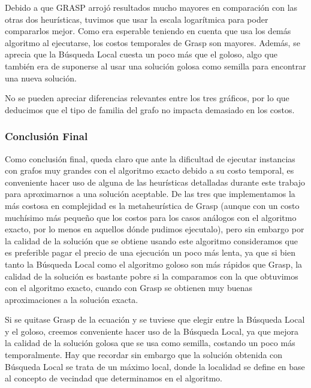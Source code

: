 \quad Debido a que GRASP arrojó resultados mucho mayores en comparación con las otras dos heurísticas, tuvimos que usar la escala logarítmica para poder compararlos mejor. Como era esperable teniendo en cuenta que usa los demás algoritmo al ejecutarse, los costos temporales de Grasp son mayores. Además, se aprecia que la Búsqueda Local cuesta un poco más que el goloso, algo que también era de suponerse al usar una solución golosa como semilla para encontrar una nueva solución.

\quad No se pueden apreciar diferencias relevantes entre los tres gráficos, por lo que deducimos que el tipo de familia del grafo no impacta demasiado en los costos.

\subsubsection{Conclusión Final}

\quad Como conclusión final, queda claro que ante la dificultad de ejecutar instancias con grafos muy grandes con el algoritmo exacto debido a su costo temporal, es conveniente hacer uso de alguna de las heurísticas detalladas durante este trabajo para aproximarnos a una solución aceptable. De las tres que implementamos la más costosa en complejidad es la metaheurística de Grasp (aunque con un costo muchísimo más pequeño que los costos para los casos análogos con el algoritmo exacto, por lo menos en aquellos dónde pudimos ejecutalo), pero sin embargo por la calidad de la solución que se obtiene usando este algoritmo consideramos que es preferible pagar el precio de una ejecución un poco más lenta, ya que si bien tanto la Búsqueda Local como el algoritmo goloso son más rápidos que Grasp, la calidad de la solución es bastante pobre si la comparamos con la que obtuvimos con el algoritmo exacto, cuando con Grasp se obtienen muy buenas aproximaciones a la solución exacta.

\quad Si se quitase Grasp de la ecuación y se tuviese que elegir entre la Búsqueda Local y el goloso, creemos conveniente hacer uso de la Búsqueda Local, ya que mejora la calidad de la solución golosa que se usa como semilla, costando un poco más temporalmente. Hay que recordar sin embargo que la solución obtenida con Búsqueda Local se trata de un máximo local, donde la localidad se define en base al concepto de vecindad que determinamos en el algoritmo.

